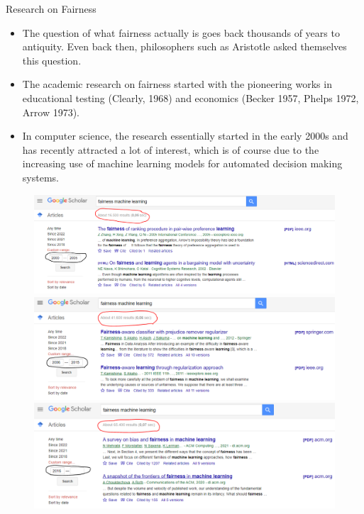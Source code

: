 \begin{vbframe}{Research on Fairness}
%
	\small
	\begin{itemize}
		\item The question of what fairness actually is goes back thousands of years to antiquity. Even back then, philosophers such as Aristotle asked themselves this question.
	\end{itemize}
	\begin{minipage}{0.5\textwidth}
		\begin{itemize}
			\item The academic research on fairness started with the pioneering works in educational testing (Clearly, 1968) and economics (Becker 1957, Phelps 1972, Arrow 1973).
			\item In computer science, the research essentially started in the early 2000s and has recently attracted a lot of interest, which is of course due to the increasing use of machine learning models for automated decision making systems.
		\end{itemize}
	\end{minipage}
	\begin{minipage}{0.45\textwidth}
		\begin{figure}
			\centering
			\includegraphics[width=0.99\linewidth]{figure/fairness_research_1}
			\includegraphics[width=0.99\linewidth]{figure/fairness_research_2}
			\includegraphics[width=0.99\linewidth]{figure/fairness_research_3}
		\end{figure}
	\end{minipage}
%
\end{vbframe} 

